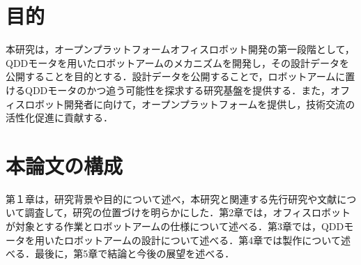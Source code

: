 
\section{目的}
本研究は，オープンプラットフォームオフィスロボット開発の第一段階として，QDDモータを用いたロボットアームのメカニズムを開発し，その設計データを公開することを目的とする．設計データを公開することで，ロボットアームに置けるQDDモータのかつ追う可能性を探求する研究基盤を提供する．また，オフィスロボット開発者に向けて，オープンプラットフォームを提供し，技術交流の活性化促進に貢献する．
\section{本論文の構成}
第１章は，研究背景や目的について述べ，本研究と関連する先行研究や文献について調査して，研究の位置づけを明らかにした．第2章では，オフィスロボットが対象とする作業とロボットアームの仕様について述べる．第3章では，QDDモータを用いたロボットアームの設計について述べる．第4章では製作について述べる．最後に，第5章で結論と今後の展望を述べる．

\newpage